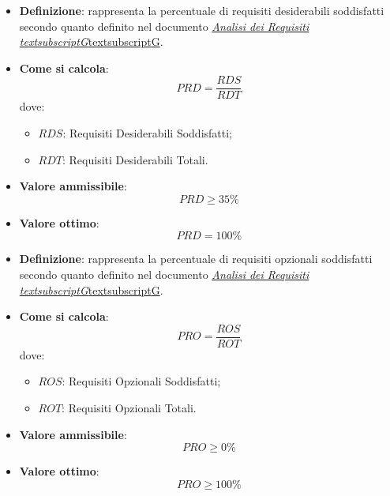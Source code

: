 \hypertarget{12M}{}
\begin{itemize}
	\item \textbf{Definizione}: rappresenta la percentuale di requisiti desiderabili soddisfatti secondo quanto definito nel documento \href{https://7last.github.io/docs/rtb/documentazione-interna/glossario\#analisi-dei-requisiti}{\href{https://7last.github.io/docs/rtb/documentazione-interna/glossario\#analisi-dei-requisiti}{\textit{Analisi dei Requisiti\\textsubscript{G}}textsubscript{G}}}.
	\item \textbf{Come si calcola}: \begin{equation*}PRD = \frac{RDS}{RDT}\end{equation*} dove:
		\begin{itemize}
			\item $RDS$: Requisiti Desiderabili Soddisfatti;
			\item $RDT$: Requisiti Desiderabili Totali.
		\end{itemize}
	\item \textbf{Valore ammissibile}: \begin{equation*}PRD \geq 35\%\end{equation*}
	\item \textbf{Valore ottimo}: \begin{equation*}PRD = 100\%\end{equation*}
\end{itemize}

\hypertarget{13M}{}
\begin{itemize}
	\item \textbf{Definizione}: rappresenta la percentuale di requisiti opzionali soddisfatti secondo quanto definito nel documento \href{https://7last.github.io/docs/rtb/documentazione-interna/glossario\#analisi-dei-requisiti}{\href{https://7last.github.io/docs/rtb/documentazione-interna/glossario\#analisi-dei-requisiti}{\textit{Analisi dei Requisiti\\textsubscript{G}}textsubscript{G}}}.
	\item \textbf{Come si calcola}: \begin{equation*}PRO = \frac{ROS}{ROT}\end{equation*} dove:
		\begin{itemize}
			\item $ROS$: Requisiti Opzionali Soddisfatti;
			\item $ROT$: Requisiti Opzionali Totali.
		\end{itemize}
	\item \textbf{Valore ammissibile}: \begin{equation*}PRO \geq 0\%\end{equation*}
	\item \textbf{Valore ottimo}: \begin{equation*}PRO \geq 100\%\end{equation*}
\end{itemize}

